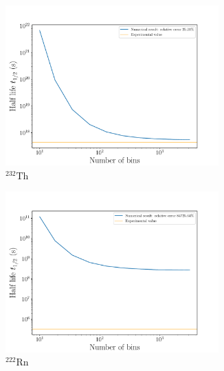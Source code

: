 \documentclass[a4paper,DIV=12,english]{scrartcl}
\begin{document}
\begin{figure}
    \begin{subfigure}{0.49\textwidth}
        \centering
        \includegraphics[width=0.9\textwidth]{../plots/bin_dependence/bins_th232.pdf}
        \caption{$^{232}\text{Th}$}
        \label{subfig:bins_th232}
    \end{subfigure}
    \begin{subfigure}{0.49\textwidth}
        \centering
        \includegraphics[width=0.9\textwidth]{../plots/bin_dependence/bins_rn222.pdf}
        \caption{$^{222}\text{Rn}$}
        \label{subfig:bins_rn222}
    \end{subfigure}\\
    \begin{subfigure}{0.49\textwidth}
        \centering

\end{subfigure}
\end{figure}
\end{document}
